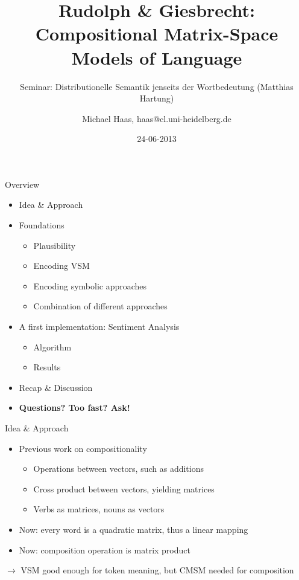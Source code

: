 \documentclass[12pt,a4paper]{beamer}
\author{Michael Haas, haas@cl.uni-heidelberg.de}
\title{Rudolph \& Giesbrecht: Compositional Matrix-Space Models of Language}
\subtitle{Seminar: Distributionelle Semantik jenseits der Wortbedeutung (Matthias Hartung)}
\date{24-06-2013}
\begin{document}
\begin{frame}
\maketitle
\end{frame}

\begin{frame}{Overview}
\begin{itemize}
\item Idea \& Approach %
\item Foundations
\begin{itemize}
    \item Plausibility %
    \item Encoding VSM %
    \item Encoding symbolic approaches
    \item Combination of different approaches
\end{itemize}
\item A first implementation: Sentiment Analysis
\begin{itemize}
    \item Algorithm %
    \item Results %
\end{itemize}
\item Recap \& Discussion
\item \textbf{Questions? Too fast? Ask!}
\end{itemize}
\end{frame}

\begin{frame}{Idea \& Approach}
\begin{itemize}
\item Previous work on compositionality
    \begin{itemize}
    \item Operations between vectors, such as additions
    \item Cross product between vectors, yielding matrices %
    \item Verbs as matrices, nouns as vectors
\end{itemize}
\item Now: every word is a quadratic matrix, thus a linear mapping
\item Now: composition operation is matrix product
\end{itemize}
$\to$ VSM good enough for token meaning, but CMSM needed for composition
\end{frame}
\end{document}
